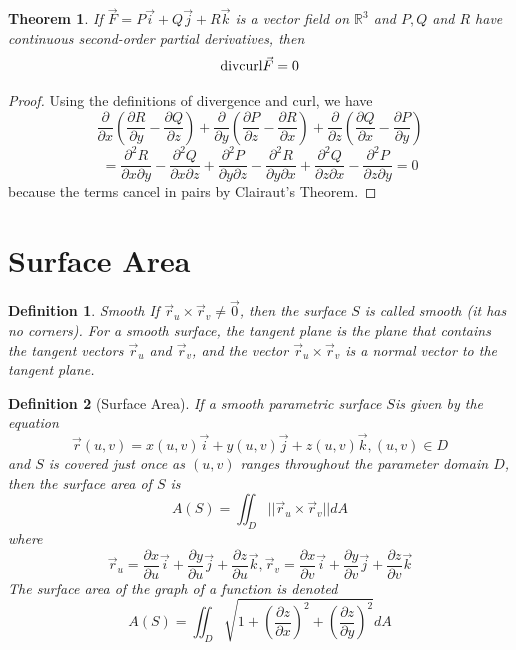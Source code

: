 \documentclass[10pt]{report}
\newtheorem{thm2}{Theorem}[section]
\newtheorem{def2}{Definition}[section]
\newcommand{\curl}{\textup{curl}}
\newcommand{\diverg}{\textup{div}}
\begin{document}
\begin{thm2}
If $\vec{F}=P\vec{i}+Q\vec{j}+R\vec{k}$ is a vector field on $\mathbb{R}^3$ and $P,Q$ and $R$ have continuous second-order partial derivatives, then
$$\diverg\curl\vec{F} = 0$$
\end{thm2}
\begin{proof}
Using the definitions of divergence and curl, we have
$$\frac{\partial}{\partial x}\left( \frac{\partial R}{\partial y} - \frac{\partial Q}{\partial z}\right) + \frac{\partial}{\partial y}\left( \frac{\partial P}{\partial z} - \frac{\partial R}{\partial x}\right) + \frac{\partial}{\partial z}\left( \frac{\partial Q}{\partial x} - \frac{\partial P}{\partial y}\right)$$
$$=\frac{\partial^2 R}{\partial x\partial y} - \frac{\partial^2 Q}{\partial x\partial z} + \frac{\partial^2 P}{\partial y\partial z} - \frac{\partial^2 R}{\partial y\partial x} + \frac{\partial^2 Q}{\partial z\partial x} - \frac{\partial^2 P}{\partial z\partial y}=0$$
because the terms cancel in pairs by Clairaut's Theorem.
\end{proof}
\section{Surface Area}
\begin{def2}{Smooth}
If $\vec{r}_u\times\vec{r}_v\neq\vec{0}$, then the surface $S$ is called smooth (it has no corners). For a smooth surface, the tangent plane is the plane that contains the tangent vectors $\vec{r}_u$ and $\vec{r}_v$, and the vector $\vec{r}_u\times\vec{r}_v$ is a normal vector to the tangent plane.
\end{def2}
\begin{def2}[Surface Area]
If a smooth parametric surface $S$is given by the equation
$$\vec{r}(u,v)=x(u,v)\vec{i}+y(u,v)\vec{j} + z(u,v)\vec{k}, (u,v)\in D$$
and $S$ is covered just once as $(u,v)$ ranges throughout the parameter domain $D$, then the surface area of $S$ is
$$A(S) = \iint_D ||\vec{r}_u\times\vec{r}_v||dA$$
where
$$\vec{r}_u = \frac{\partial x}{\partial u}\vec{i} + \frac{\partial y}{\partial u}\vec{j} + \frac{\partial z}{\partial u}\vec{k}, \vec{r}_v = \frac{\partial x}{\partial v}\vec{i} + \frac{\partial y}{\partial v}\vec{j} + \frac{\partial z}{\partial v}\vec{k}$$
The surface area of the graph of a function is denoted
$$A(S) = \iint_D\sqrt{1 + \left( \frac{\partial z}{\partial x}\right)^2 + \left( \frac{\partial z}{\partial y}\right)^2}dA$$
\end{def2}
\end{document}
